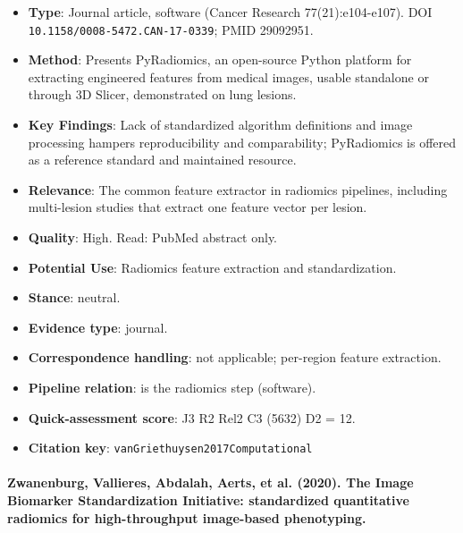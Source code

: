 \documentclass[journal,onecolumn]{IEEEtran}
\begin{document}
\begin{itemize}

\item{} \textbf{Type}: Journal article, software (Cancer Research 77(21):e104-e107). DOI \nolinkurl{10.1158/0008-5472.CAN-17-0339}; PMID 29092951.

\item{} \textbf{Method}: Presents PyRadiomics, an open-source Python platform for extracting engineered features from medical images, usable standalone or through 3D Slicer, demonstrated on lung lesions.

\item{} \textbf{Key Findings}: Lack of standardized algorithm definitions and image processing hampers reproducibility and comparability; PyRadiomics is offered as a reference standard and maintained resource.

\item{} \textbf{Relevance}: The common feature extractor in radiomics pipelines, including multi-lesion studies that extract one feature vector per lesion.

\item{} \textbf{Quality}: High. Read: PubMed abstract only.

\item{} \textbf{Potential Use}: Radiomics feature extraction and standardization.

\item{} \textbf{Stance}: neutral.

\item{} \textbf{Evidence type}: journal.

\item{} \textbf{Correspondence handling}: not applicable; per-region feature extraction.

\item{} \textbf{Pipeline relation}: is the radiomics step (software).

\item{} \textbf{Quick-assessment score}: J3 R2 Rel2 C3 (5632) D2 = 12.

\item{} \textbf{Citation key}: \texttt{vanGriethuysen2017Computational}

\end{itemize}

\paragraph{Zwanenburg, Vallieres, Abdalah, Aerts, et al. (2020). The Image Biomarker Standardization Initiative: standardized quantitative radiomics for high-throughput image-based phenotyping.~\cite{Zwanenburg2020Image}}\mbox{}
\end{document}
